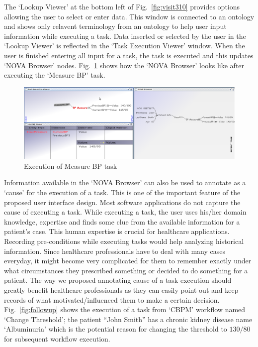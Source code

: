 \documentclass[a4paper]{llncs}
\begin{document}
The `Lookup Viewer' at the bottom left of Fig.~\ref{fig:visit310} provides options allowing the user to select or enter data. 
This window is connected to an ontology and shows only relavent terminology from an ontology to help user input information while executing a task. 
Data inserted or selected by the user in the `Lookup Viewer' is reflected in the `Task Execution Viewer' window. 
When the user is finished entering all input for a task, the task is executed and this updates `NOVA Browser' nodes. 
Fig.~\ref{fig:visit311} shows how the `NOVA Browser' looks like after executing the `Measure BP' task. 

\begin{figure}
  \begin{center}
    \includegraphics[width=\textwidth]{Visit1_1_new.png}
    \caption{Execution of Measure BP task }
    \label{fig:visit311}
  \end{center}
\end{figure}


Information available in the `NOVA Browser' can also be used to annotate as a `cause' for the execution of a task. 
This is one of the important feature of the proposed user interface design. Most software applications do not capture the cause of executing a task. 
While executing a task, the user uses his/her domain knowledge, expertise and finds some clue from the available information for a patient's case. 
This human expertise is crucial for healthcare applications. Recording pre-conditions while executing tasks would help analyzing historical information. 
Since healthcare professionals have to deal with many cases everyday, it might become very complicated for them to remember exactly under what circumstances they prescribed something or decided 
to do something for a patient. 
The way we proposed annotating cause of a task execution should greatly benefit healthcare professionals as they can easily point out and keep records of what motivated/influenced 
them to make a certain decision. 
Fig.~\ref{fig:followup} shows the execution of a task from `CBPM' workflow named `Change Threshold'; the patient ``John Smith'' has a chronic kidney disease name `Albuminuria' 
which is the potential reason for changing the threshold to $130/80$ for subsequent workflow execution. 
\end{document}
